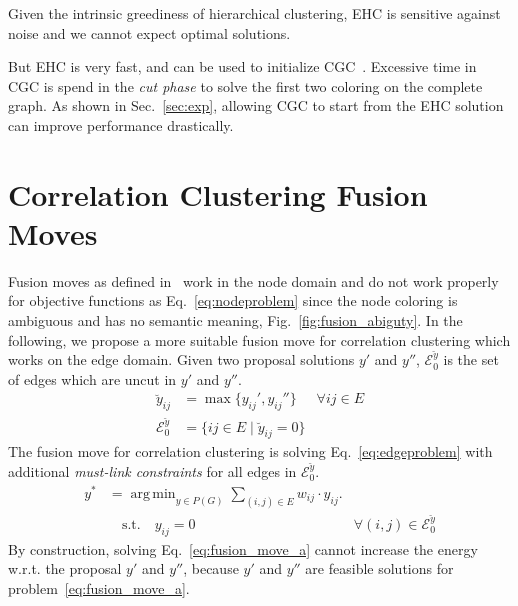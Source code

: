 \documentclass[10pt,twocolumn,letterpaper]{article}
\DeclareMathOperator*{\argmin}{arg\,min}
\theoremstyle{definition}
\begin{document}
Given the intrinsic greediness of hierarchical clustering, 
EHC is sensitive against noise and we cannot expect optimal solutions.

But EHC is very fast, and can be used to initialize
CGC~\cite{beier_2014_cvpr}. Excessive time in CGC
is spend in the \emph{cut phase} to solve the 
first two coloring on the complete graph.
As shown in Sec.~\ref{sec:exp},
allowing CGC to start from the EHC solution
can improve performance drastically.






\section{Correlation Clustering Fusion Moves}\label{sec:cc_fm}

Fusion moves as defined in~\cite{Lempitsky-2010} work
in the node domain and do not work properly for 
objective functions as Eq.~\ref{eq:nodeproblem} since
the node coloring is ambiguous and has no semantic meaning, \cf Fig.~\ref{fig:fusion_abiguty}.
In the following, we propose a more suitable fusion move for correlation
clustering which works on the edge domain.
%
Given two proposal solutions $y'$ and $y''$,
$\mathcal{E}_0^{\breve{y}}$ is the set of edges
which are uncut in $y'$ and $y''$.
%
\begin{align}
\breve{y}_{ij}    & = \max\{ y_{ij}', y_{ij}''\}  & \forall {ij}\in E\\  %
\mathcal{E}_0^{\breve{y}}  & =  \{ ij \in E \; | \; \breve{y}_{ij} = 0 \}
\end{align}
%
The fusion move for correlation clustering is solving Eq.~\ref{eq:edgeproblem}
with additional \emph{must-link constraints} for all edges in $\mathcal{E}_0^{\breve{y}}$.
%
\begin{align}
  y^* &= \argmin_{y \in P(G)} \sum_{ (i,j) \in E } w_{ij} \cdot y_{ij} \label{eq:fusion_move_a}.\\ 
      &\quad \textrm{s.t.} \quad y_{ij} = 0 & \forall (i, j) \in \mathcal{E}_0^{\breve{y}} \nonumber
\end{align}
%
By construction, solving Eq.~\ref{eq:fusion_move_a} cannot increase the energy w.r.t. the proposal
$y'$ and $y''$,
because $y'$ and $y''$ are feasible solutions for problem~\ref{eq:fusion_move_a}.
%
\end{document}
